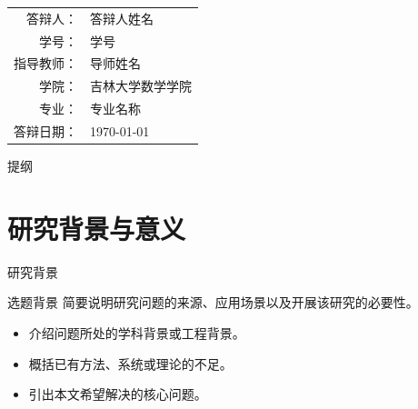 \documentclass[12pt,aspectratio=43]{beamer}
\title[\ThesisShortTitle]{\ThesisTitle}
\author[\AuthorName]{\AuthorName}
\institute[\DepartmentName]{\DepartmentName}
\date[\DefenseDate]{\DefenseDate}
\newcommand{\ThesisTitle}{吉林大学毕业论文答辩演示文稿模板}
\newcommand{\ThesisSubtitle}{基于 Beamer 的学位论文答辩模板}
\newcommand{\AuthorName}{答辩人姓名}
\newcommand{\StudentID}{学号}
\newcommand{\SupervisorName}{导师姓名}
\newcommand{\DepartmentName}{吉林大学数学学院}
\newcommand{\MajorName}{专业名称}
\newcommand{\DefenseDate}{\today}
\begin{document}
\begin{frame}

  \vspace{4.15cm}
  \begin{center}
    \small
    \begin{tabular}{rl}
      答辩人： & \AuthorName \\
      学号： & \StudentID \\
      指导教师： & \SupervisorName \\
      学院： & \DepartmentName \\
      专业： & \MajorName \\
      答辩日期： & \DefenseDate
    \end{tabular}
  \end{center}
\end{frame}

\begin{frame}{提纲}
  \vspace{.45cm}
  \tableofcontents
\end{frame}

\section{研究背景与意义}

\begin{frame}{研究背景}
  \vspace{.7cm}
  \begin{block}{选题背景}
    简要说明研究问题的来源、应用场景以及开展该研究的必要性。
  \end{block}

  \begin{itemize}
    \item 介绍问题所处的学科背景或工程背景。
    \item 概括已有方法、系统或理论的不足。
    \item 引出本文希望解决的核心问题。
  \end{itemize}
\end{frame}
\end{document}
